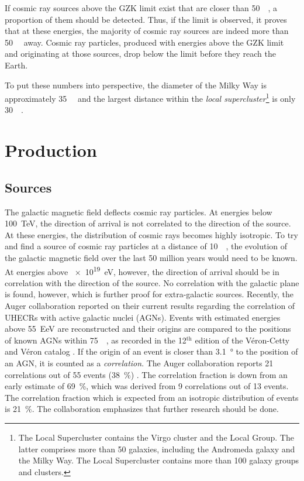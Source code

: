 If cosmic ray sources above the GZK limit exist that are closer than
\SI{50}{\mega\parsec}, a proportion of them should be detected.
Thus, if the limit is observed, it proves that at these energies, the
majority of cosmic ray sources are indeed more than \SI{50}{\mega\parsec} away.
Cosmic ray particles, produced with energies above the GZK limit and
originating at those sources, drop below the limit before they
reach the Earth.

To put these numbers into perspective, the diameter of the Milky Way is
approximately \SI{35}{\kilo\parsec} and the largest distance within the
\emph{local supercluster}\footnote{The Local Supercluster contains the Virgo
cluster and the Local Group.  The latter comprises more than 50 galaxies,
including the Andromeda galaxy and the Milky Way.  The Local Supercluster
contains more than 100 galaxy groups and clusters.} is only
\SI{30}{\mega\parsec}.


\section{Production}


\subsection{Sources}

The galactic magnetic field deflects cosmic ray particles.  At energies below
\SI{100}{\tera\electronvolt}, the direction of arrival is not correlated to the
direction of the source.  At these energies, the distribution of cosmic rays
becomes highly isotropic.  To try and find a source of cosmic ray particles
at a distance of \SI{10}{\mega\parsec}, the evolution of
the galactic magnetic field over the last 50 million years would need to be known.
At energies above \SI{e19}{\electronvolt}, however, the direction of arrival
should be in correlation with the direction of the source.  No correlation with the
galactic plane is found, however, which is further proof for extra-galactic sources.
Recently, the Auger collaboration reported \cite{Abreu:2010} on their current
results regarding the correlation of UHECRs with
active galactic nuclei (AGNs).  Events with estimated energies above
\SI{55}{\exa\electronvolt} are reconstructed and their origins are compared to
the positions of known AGNs within \SI{75}{\mega\parsec}, as recorded in the
12$^{\mathrm{th}}$ edition of the Véron-Cetty and Véron catalog
\cite{VCV-catalog}.  If the origin of an event is closer than \SI{3.1}{\degree}
to the position of an AGN, it is counted as a \emph{correlation}.  The Auger
collaboration reports 21 correlations out of 55 events
(\SI{38}{\percent}) \cite{Abreu:2010}.  The correlation fraction is down from an
early estimate of \SI{69}{\percent}, which was derived from 9 correlations out
of 13 events.
The correlation fraction which is expected from an isotropic distribution of events
is \SI{21}{\percent}.  The collaboration emphasizes that further research should
be done.

